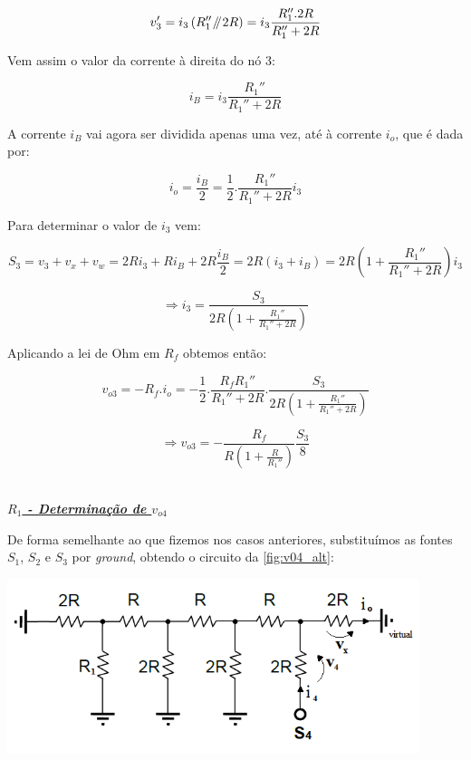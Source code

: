 \documentclass[a4paper,11pt]{report}
\newcommand{\parallelsum}{\mathbin{\!/\mkern-5mu/\!}} %
\begin{document}
$$v_3'=i_3\left(R_1''\parallelsum 2R\right)=i_3\frac{R_1''.2R}{R_1''+2R}$$

Vem assim o valor da corrente à direita do nó 3:

$$i_B=i_3\frac{R_1''}{R_1''+2R}$$

A corrente $i_B$ vai agora ser dividida apenas uma vez, até à corrente $i_o$, que é dada por:

$$i_o=\frac{i_B}{2}=\frac{1}{2}.\frac{R_1''}{R_1''+2R}i_3$$

Para determinar o valor de $i_3$ vem:

$$S_3=v_3+v_x+v_w=2Ri_3+Ri_B+2R\frac{i_B}{2}=2R\left(i_3+i_B\right)=2R\left(1+\frac{R_1''}{R_1''+2R}\right)i_3$$

$$\Rightarrow i_3=\frac{S_3}{2R\left(1+\frac{R_1''}{R_1''+2R}\right)}$$

Aplicando a lei de Ohm em $R_f$ obtemos então:

$$v_{o3}=-R_f.i_o=-\frac{1}{2}.\frac{R_fR_1''}{R_1''+2R}.\frac{S_3}{2R\left(1+\frac{R_1''}{R_1''+2R}\right)}$$

\begin{equation}\label{eq:v03_1}
\Rightarrow v_{o3}=-\frac{R_f}{R\left(1+\frac{R}{R_1''}\right)}\frac{S_3}{8}
\end{equation}\\

\par

\large\underline{\textit{\textbf{$R_1$ - Determinação de $v_{o4}$}}}\\
\par

De forma semelhante ao que fizemos nos casos anteriores, substituímos as fontes $S_1$,  $S_2$ e $S_3$ por \textit{ground}, obtendo o circuito da \ref{fig:v04_alt}:

\begin{center}
     \includegraphics[angle=0,width=0.9\textwidth]{v04_alt.png}
     \label{fig:v04_alt}
     \end{center}
\end{document}
